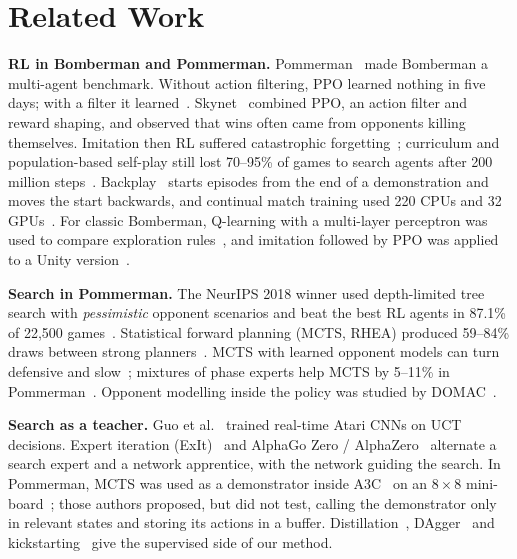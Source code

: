 \documentclass[conference]{IEEEtran}
\begin{document}
\section{Related Work}

\textbf{RL in Bomberman and Pommerman.} Pommerman~\cite{resnick2018pommerman} made Bomberman a multi-agent benchmark. Without action filtering, PPO learned nothing in five days; with a filter it learned~\cite{gao2019hard}. Skynet~\cite{gao2019skynet} combined PPO, an action filter and reward shaping, and observed that wins often came from opponents killing themselves. Imitation then RL suffered catastrophic forgetting~\cite{meisheri2019}; curriculum and population-based self-play still lost 70--95\% of games to search agents after 200 million steps~\cite{huynh2024}. Backplay~\cite{resnick2018backplay} starts episodes from the end of a demonstration and moves the start backwards, and continual match training used 220 CPUs and 32 GPUs~\cite{peng2018continual}. For classic Bomberman, Q-learning with a multi-layer perceptron was used to compare exploration rules~\cite{kormelink2018}, and imitation followed by PPO was applied to a Unity version~\cite{goulart2019}.

\textbf{Search in Pommerman.} The NeurIPS 2018 winner used depth-limited tree search with \emph{pessimistic} opponent scenarios and beat the best RL agents in 87.1\% of 22{,}500 games~\cite{osogami2019}. Statistical forward planning (MCTS, RHEA) produced 59--84\% draws between strong planners~\cite{perezliebana2019}. MCTS with learned opponent models can turn defensive and slow~\cite{weil2023}; mixtures of phase experts help MCTS by 5--11\% in Pommerman~\cite{helfenstein2024}. Opponent modelling inside the policy was studied by DOMAC~\cite{sun2022domac}.

\textbf{Search as a teacher.} Guo et al.~\cite{guo2014uct} trained real-time Atari CNNs on UCT decisions. Expert iteration (ExIt)~\cite{anthony2017exit} and AlphaGo Zero / AlphaZero~\cite{silver2017agz,silver2017alphazero} alternate a search expert and a network apprentice, with the network guiding the search. In Pommerman, MCTS was used as a demonstrator inside A3C~\cite{mnih2016a3c} on an $8\times8$ mini-board~\cite{kartal2018demonstrator,kartal2019safer,kartal2019guidance}; those authors proposed, but did not test, calling the demonstrator only in relevant states and storing its actions in a buffer. Distillation~\cite{hinton2015distill,rusu2016distill,czarnecki2019distill}, DAgger~\cite{ross2011dagger} and kickstarting~\cite{schmitt2018kickstart} give the supervised side of our method.
\end{document}
